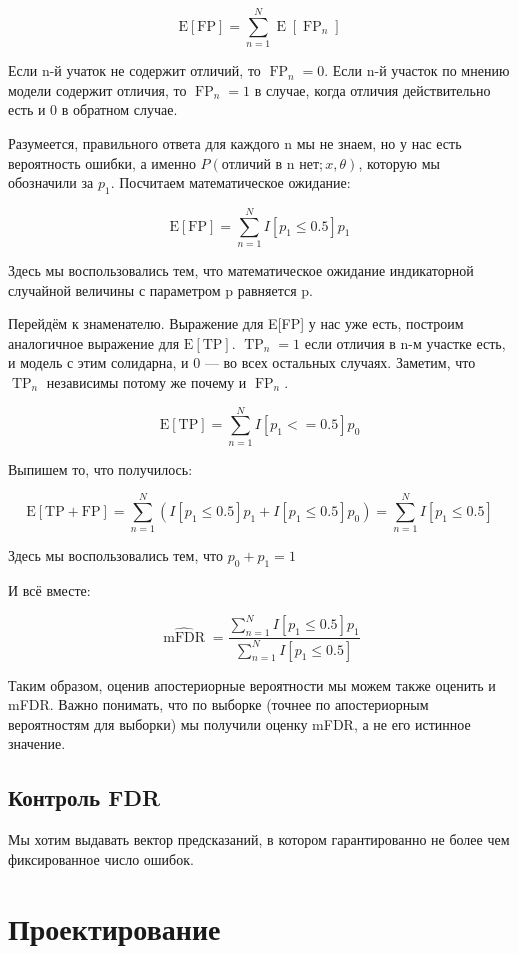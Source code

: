 \documentclass{matmex-diploma-custom}
\begin{document}
$$\operatorname{E[FP]} = \sum\limits_{n = 1}^N \operatorname{E}[\operatorname{FP}_n]$$

Если n-й учаток не содержит отличий, то $\operatorname{FP}_n = 0$. Если n-й участок по мнению модели содержит отличия, то $\operatorname{FP}_n = 1$ в случае, когда отличия действительно есть и 0 в обратном случае.

Разумеется, правильного ответа для каждого n мы не знаем, но у нас есть вероятность ошибки, а именно $P(\textrm{отличий в n нет}; x, \theta)$, которую мы обозначили за $p_1$. Посчитаем математическое ожидание:

$$\operatorname{E[FP]} = \sum\limits_{n = 1}^N I[p_1 \le 0.5] p_1$$

Здесь мы воспользовались тем, что математическое ожидание индикаторной случайной величины с параметром p равняется p.

Перейдём к знаменателю. Выражение для E[FP] у нас уже есть, построим аналогичное выражение для $\operatorname{E[TP]}$.  $\operatorname{TP}_n = 1$ если отличия в n-м участке есть, и модель с этим солидарна, и 0 — во всех остальных случаях. Заметим, что $\operatorname{TP}_n$ независимы потому же почему и $\operatorname{FP}_n$.

$$\operatorname{E[TP]}= \sum\limits_{n = 1}^N I[p_1 <= 0.5] p_0$$

Выпишем то, что получилось:

$$\operatorname{E[TP + FP]} = \sum\limits_{n = 1}^N (I[p_1 \le 0.5] p_1 + I[p_1 \le 0.5] p_0) = \sum\limits_{n = 1}^N I[p_1 \le 0.5]$$

Здесь мы воспользовались тем, что $p_0 + p_1 = 1$

И всё вместе:

$$\widehat{\operatorname{mFDR}} = \frac{ \sum\limits_{n = 1}^N I[p_1 \le 0.5] p_1}{\sum\limits_{n = 1}^N I[p_1 \le 0.5]}$$

Таким образом, оценив апостериорные вероятности мы можем также оценить и mFDR. Важно понимать, что по выборке (точнее по апостериорным вероятностям для выборки) мы получили оценку mFDR, а не его истинное значение. 

\subsection{Контроль FDR}

Мы хотим выдавать вектор предсказаний, в котором гарантированно не более чем фиксированное число ошибок.

\section{Проектирование}
\end{document}
